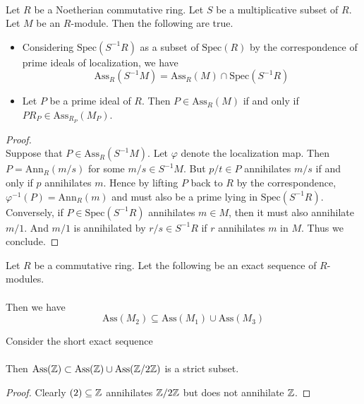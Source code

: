 \documentclass[a4paper]{article}
\begin{document}
\begin{prp}{}{}\\
Let $R$ be a Noetherian commutative ring. Let $S$ be a multiplicative subset of $R$. Let $M$ be an $R$-module. Then the following are true. 
\begin{itemize}
\item Considering $\text{Spec}(S^{-1}R)$ as a subset of $\text{Spec}(R)$ by the correspondence of prime ideals of localization, we have $$\text{Ass}_R(S^{-1}M)=\text{Ass}_R(M)\cap\text{Spec}(S^{-1}R)$$
\item Let $P$ be a prime ideal of $R$. Then $P\in\text{Ass}_R(M)$ if and only if $PR_P\in\text{Ass}_{R_P}(M_P)$. 
\end{itemize}
\begin{proof}\\
Suppose that $P\in\text{Ass}_R(S^{-1}M)$. Let $\varphi$ denote the localization map. Then $P=\text{Ann}_R(m/s)$ for some $m/s\in S^{-1}M$. But $p/t\in P$ annihilates $m/s$ if and only if $p$ annihilates $m$. Hence by lifting $P$ back to $R$ by the correspondence, $\varphi^{-1}(P)=\text{Ann}_R(m)$ and must also be a prime lying in $\text{Spec}(S^{-1}R)$. \\

Conversely, if $P\in\text{Spec}(S^{-1}R)$ annihilates $m\in M$, then it must also annihilate $m/1$. And $m/1$ is annihilated by $r/s\in S^{-1}R$ if $r$ annihilates $m$ in $M$. Thus we conclude. 
\end{proof}
\end{prp}

\begin{prp}{}{} Let $R$ be a commutative ring. Let the following be an exact sequence of $R$-modules. \\
\\
Then we have $$\text{Ass}(M_2)\subseteq\text{Ass}(M_1)\cup\text{Ass}(M_3)$$
\end{prp}

\begin{eg}{}{} Consider the short exact sequence \\
\\
Then $\text{Ass}(\mathbb{Z})\subset\text{Ass}(\mathbb{Z})\cup\text{Ass}(\mathbb{Z}/2\mathbb{Z})$ is a strict subset. 
\begin{proof}
Clearly $(2)\subseteq\mathbb{Z}$ annihilates $\mathbb{Z}/2\mathbb{Z}$ but does not annihilate $\mathbb{Z}$. 
\end{proof}
\end{eg}
\end{document}
